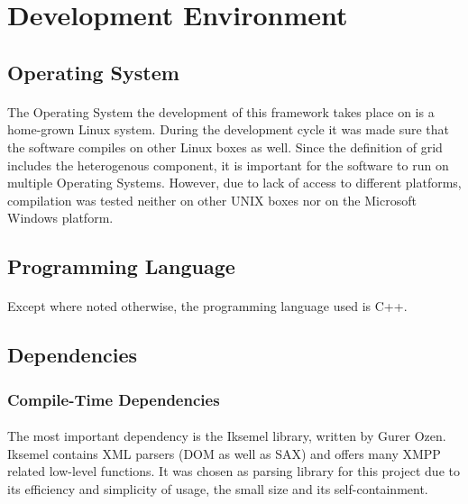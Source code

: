 \section{Development Environment}

\subsection{Operating System}
\paragraph{}
The Operating System the development of this framework takes place on is a home-grown Linux system. During the development cycle it was made sure that the software compiles on other Linux boxes as well. Since the definition of grid includes the heterogenous component, it is important for the software to run on multiple Operating Systems. However, due to lack of access to different platforms, compilation was tested neither on other UNIX boxes nor on the Microsoft Windows platform.

\subsection{Programming Language}
\paragraph{}
Except where noted otherwise, the programming language used is C++.

\subsection{Dependencies}
\label{sec:depend}

\subsubsection{Compile-Time Dependencies}
\label{sec:compdepend}
\paragraph{}
The most important dependency is the Iksemel library, written by Gurer Ozen. Iksemel contains XML parsers (DOM as well as SAX) and offers many XMPP related low-level functions. It was chosen as parsing library for this project due to its efficiency and simplicity of usage, the small size and its self-containment.

